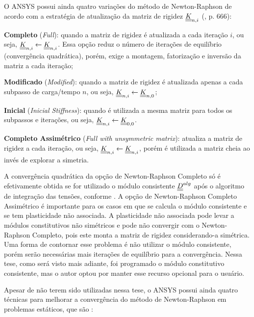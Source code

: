 O ANSYS possui ainda quatro variações do método de Newton-Raphson de acordo com a estratégia de atualização da matriz de rigidez $\underline{\underline K}_{n,i}$ (\citeyear{ANSYS2018}, p. 666): 
\begin{alineas}
	
	\item \textbf{Completo} (\textit{Full}): quando a matriz de rigidez é atualizada a cada iteração $i$, ou seja, $\underline{\underline K}_{n,i} \leftarrow \underline{\underline K}_{n,i}$. Essa opção reduz o número de iterações de equilíbrio (convergência quadrática), porém, exige a montagem, fatorização e inversão da matriz a cada iteração;
	
	\item \textbf{Modificado} (\textit{Modified}): quando a matriz de rigidez é atualizada apenas a cada subpasso de carga/tempo $n$, ou seja, $\underline{\underline K}_{n,i} \leftarrow \underline{\underline K}_{n,0}$; 
	
	\item \textbf{Inicial} (\textit{Inicial Stiffness}): quando é utilizada a mesma matriz para todos os subpassos e iterações, ou seja, $\underline{\underline K}_{n,i} \leftarrow \underline{\underline K}_{0,0}$. 
	
	\item \textbf{Completo Assimétrico} (\textit{Full with unsymmetric matrix}): atualiza a matriz de rigidez a cada iteração, ou seja, $\underline{\underline K}_{n,i} \leftarrow \underline{\underline K}_{n,i}$, porém é utilizada a matriz cheia ao invés de explorar a simetria.
	
\end{alineas}

A convergência quadrática da opção de Newton-Raphson Completo só é efetivamente obtida se for utilizado o módulo consistente $\underline{\underline D}^{alg}$ após o algoritmo de integração das tensões, conforme . A opção de Newton-Raphson Completo Assimétrico é importante para os casos em que se calcula o módulo consistente e se tem plasticidade não associada. A plasticidade não associada pode levar a módulos constitutivos não simétricos e pode não convergir com o Newton-Raphson Completo, pois este monta a matriz de rigidez considerando-a simétrica. Uma forma de contornar esse problema é não utilizar o módulo consistente, porém serão necessárias mais iterações de equilíbrio para a convergência. Nessa tese, como será visto mais adiante, foi programado o módulo constitutivo consistente, mas o autor optou por manter esse recurso opcional para o usuário.

Apesar de não terem sido utilizadas nessa tese, o ANSYS possui ainda quatro técnicas para melhorar a convergência do método de Newton-Raphson em problemas estáticos, que são \cite[p. 668-673]{ANSYS2018}:

